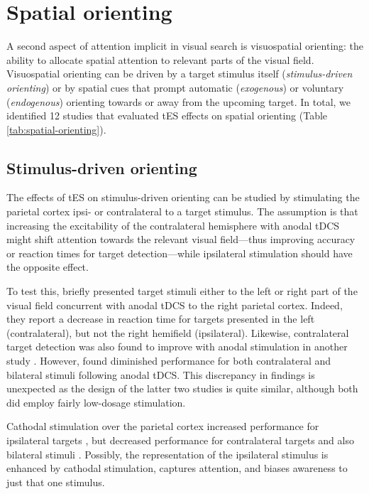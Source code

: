 \documentclass[11pt,english,]{memoir}
\begin{document}
\hypertarget{spatial-orienting}{%
\section{Spatial orienting}\label{spatial-orienting}}

A second aspect of attention implicit in visual search is visuospatial orienting: the ability to allocate spatial attention to relevant parts of the visual field. Visuospatial orienting can be driven by a target stimulus itself (\emph{stimulus-driven orienting}) or by spatial cues that prompt automatic (\emph{exogenous}) or voluntary (\emph{endogenous}) orienting towards or away from the upcoming target. In total, we identified 12 studies that evaluated tES effects on spatial orienting (Table \ref{tab:spatial-orienting}).

\hypertarget{stimulus-driven-orienting}{%
\subsection{Stimulus-driven orienting}\label{stimulus-driven-orienting}}

The effects of tES on stimulus-driven orienting can be studied by stimulating the parietal cortex ipsi- or contralateral to a target stimulus. The assumption is that increasing the excitability of the contralateral hemisphere with anodal tDCS might shift attention towards the relevant visual field---thus improving accuracy or reaction times for target detection---while ipsilateral stimulation should have the opposite effect.

To test this, \textcite{Bolognini2010a} briefly presented target stimuli either to the left or right part of the visual field concurrent with anodal tDCS to the right parietal cortex. Indeed, they report a decrease in reaction time for targets presented in the left (contralateral), but not the right hemifield (ipsilateral). Likewise, contralateral target detection was also found to improve with anodal stimulation in another study \autocite{Sparing2009}. However, \textcite{Filmer2015} found diminished performance for both contralateral and bilateral stimuli following anodal tDCS. This discrepancy in findings is unexpected as the design of the latter two studies is quite similar, although both did employ fairly low-dosage stimulation.

Cathodal stimulation over the parietal cortex increased performance for ipsilateral targets \autocite{Sparing2009}, but decreased performance for contralateral targets and also bilateral stimuli \autocites{Filmer2015}{Sparing2009}. Possibly, the representation of the ipsilateral stimulus is enhanced by cathodal stimulation, captures attention, and biases awareness to just that one stimulus.
\end{document}
